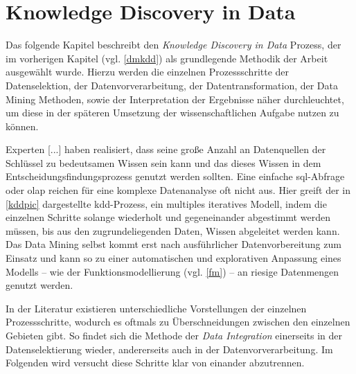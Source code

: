 \section{Knowledge Discovery in Data}
\label{kdd}

Das folgende Kapitel beschreibt den \textit{Knowledge Discovery in Data} Prozess, der im vorherigen Kapitel (vgl. \vref{dmkdd}) als grundlegende Methodik der Arbeit ausgewählt wurde. Hierzu werden die einzelnen Prozessschritte der Datenselektion, der Datenvorverarbeitung, der Datentransformation, der Data Mining Methoden, sowie der Interpretation der Ergebnisse näher durchleuchtet, um diese in der späteren Umsetzung der wissenschaftlichen Aufgabe nutzen zu können.

\glqq Experten [...] haben realisiert, dass seine große Anzahl an Datenquellen der Schlüssel zu bedeutsamen Wissen sein kann und das dieses Wissen in dem Entscheidungsfindungsprozess genutzt werden sollten. Eine einfache \gls{sql}-Abfrage oder \gls{olap} reichen für eine komplexe Datenanalyse oft nicht aus.\grqq{} Hier greift der in \vref{kddpic} dargestellte \gls{kdd}-Prozess, ein multiples iteratives Modell, indem die einzelnen Schritte solange wiederholt und gegeneinander abgestimmt werden müssen, bis aus den zugrundeliegenden Daten, Wissen abgeleitet werden kann. Das Data Mining selbst kommt erst nach ausführlicher Datenvorbereitung zum Einsatz und kann so zu einer automatischen und explorativen Anpassung eines Modells -- wie der Funktionsmodellierung (vgl. \vref{fm}) -- an riesige Datenmengen genutzt werden.

In der Literatur existieren unterschiedliche Vorstellungen der einzelnen Prozessschritte, wodurch es oftmals zu Überschneidungen zwischen den einzelnen Gebieten gibt. So findet sich die Methode der \textit{Data Integration} einerseits in der Datenselektierung wieder, andererseits auch in der Datenvorverarbeitung. Im Folgenden wird versucht diese Schritte klar von einander abzutrennen.


